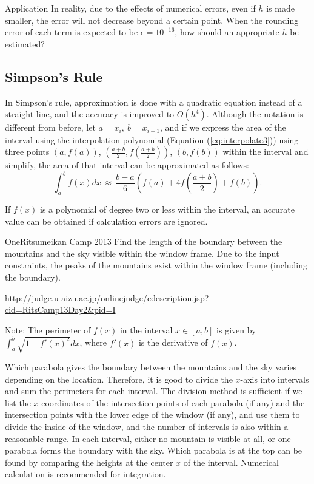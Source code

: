 \begin{versionbeta}
\begin{tipsbox}{Application}
  In reality, due to the effects of numerical errors, even if $h$ is made smaller, the error will not decrease beyond a certain point.
  When the rounding error of each term is expected to be $\epsilon=10^{-16}$, how should an appropriate $h$ be estimated?
\end{tipsbox}

\subsection{Simpson's Rule}

In Simpson's rule, approximation is done with a quadratic equation instead of a straight line, and the accuracy is improved to $O(h^4)$.
Although the notation is different from before, let $a=x_i,\ b=x_{i+1}$, and if we express the area of the interval using the interpolation polynomial (Equation (\ref{eq:interpolate3})) using three points $(a,f(a))$, $(\frac{a+b}{2},f(\frac{a+b}{2}))$, $(b,f(b))$ within the interval and simplify, the area of that interval can be approximated as follows:
$$
\int_a^b f(x) dx \,\approx\, \frac{b-a}{6}\left(f(a)+4f\left(\frac{a+b}{2}\right)+f(b)\right).
$$

If $f(x)$ is a polynomial of degree two or less within the interval, an accurate value can be obtained if calculation errors are ignored.

\begin{pbox}{One}{Ritsumeikan Camp 2013}
  Find the length of the boundary between the mountains and the sky visible within the window frame. Due to the input constraints, the peaks of the mountains exist within the window frame (including the boundary).

\url{http://judge.u-aizu.ac.jp/onlinejudge/cdescription.jsp?cid=RitsCamp13Day2&pid=I}
\end{pbox}
Note: The perimeter of $f(x)$ in the interval $x\in[a,b]$ is given by $\int_a^b \sqrt{1+f'(x)^2}dx$, where $f'(x)$ is the derivative of $f(x)$.

Which parabola gives the boundary between the mountains and the sky varies depending on the location. Therefore, it is good to divide the $x$-axis into intervals and sum the perimeters for each interval. The division method is sufficient if we list the $x$-coordinates of the intersection points of each parabola (if any) and the intersection points with the lower edge of the window (if any), and use them to divide the inside of the window, and the number of intervals is also within a reasonable range. In each interval, either no mountain is visible at all, or one parabola forms the boundary with the sky. Which parabola is at the top can be found by comparing the heights at the center $x$ of the interval. Numerical calculation is recommended for integration.


\end{versionbeta}
